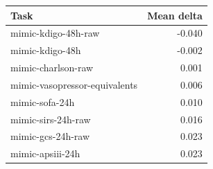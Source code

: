 \begin{tabular}{lr}
\toprule
Task & Mean delta \\
\midrule
mimic-kdigo-48h-raw & -0.040 \\
mimic-kdigo-48h & -0.002 \\
mimic-charlson-raw & 0.001 \\
mimic-vasopressor-equivalents & 0.006 \\
mimic-sofa-24h & 0.010 \\
mimic-sirs-24h-raw & 0.016 \\
mimic-gcs-24h-raw & 0.023 \\
mimic-apsiii-24h & 0.023 \\
\bottomrule
\end{tabular}
